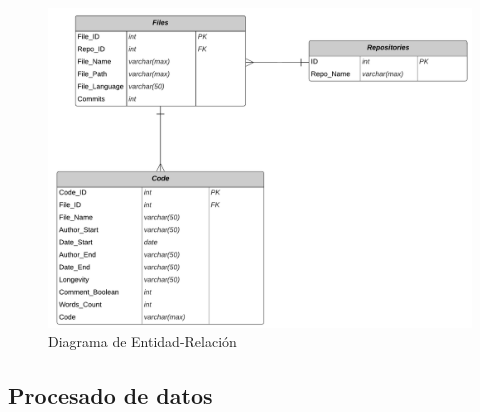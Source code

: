 \documentclass[a4paper, 12pt]{book}
\begin{document}
\begin{figure}
  \centering
  \includegraphics[width=14cm, keepaspectratio]{img/Diagrama_E-R.png}
  \caption{Diagrama de Entidad-Relación}
  \label{fig:entidad-relacion}
\end{figure}


\subsection{Procesado de datos}
\label{subsec:procesado}
\end{document}
